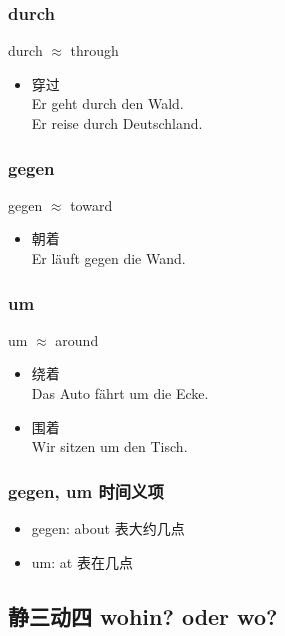 \subsubsection{durch \diam[border=true]}
durch $\approx$ through
\begin{itemize}
    \item 穿过 \\
          Er geht durch den Wald.  \\
          Er reise durch Deutschland.  \\
\end{itemize}

\subsubsection{gegen \diam[border=true]}
gegen $\approx$ toward
\begin{itemize}
    \item 朝着 \\
          Er läuft gegen die Wand.
\end{itemize}

\subsubsection{um \diam[border=true]}
um $\approx$ around
\begin{itemize}
    \item 绕着 \\
          Das Auto fährt um die Ecke.
    \item 围着 \\
          Wir sitzen um den Tisch.
\end{itemize}

\subsubsection{gegen, um 时间义项}
\begin{itemize}
    \item gegen: about 表大约几点
    \item um: at 表在几点
\end{itemize}

\subsection{静三动四 wohin? oder wo?}
